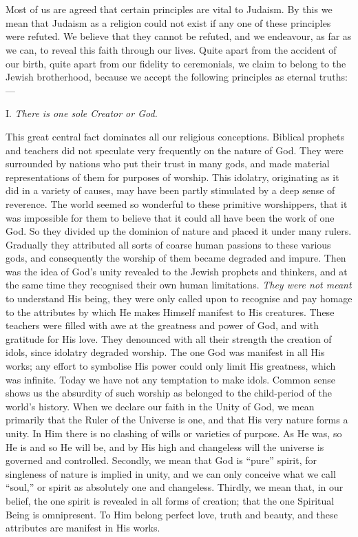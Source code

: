 \chapter{}

Most of us are agreed that certain principles
are vital to Judaism. By this we mean that
Judaism as a religion could not exist if any
one of these principles were refuted. We
believe that they cannot be refuted, and we
endeavour, as far as we can, to reveal this
faith through our lives. Quite apart from
the accident of our birth, quite apart from
our fidelity to ceremonials, we claim to belong
to the Jewish brotherhood, because we
accept the following principles as eternal
truths:—

I. \textsl{There is one sole Creator or God.}

This great central fact dominates all our
religious conceptions. Biblical prophets and
teachers did not speculate very frequently
on the nature of God. They were surrounded
by nations who put their trust in many gods,
and made material representations of them
for purposes of worship. This idolatry,
originating as it did in a variety of causes,
may have been partly stimulated by a deep
sense of reverence. The world seemed so
wonderful to these primitive worshippers,
that it was impossible for them to believe
that it could all have been the work of one
God. So they divided up the dominion of
nature and placed it under many rulers.
Gradually they attributed all sorts of coarse
human passions to these various gods, and
consequently the worship of them became
degraded and impure. Then was the idea
of God’s unity revealed to the Jewish prophets
and thinkers, and at the same time they
recognised their own human limitations.
\textsl{They were not meant} to understand His
being, they were only called upon to recognise
and pay homage to the attributes by
which He makes Himself manifest to His
creatures. These teachers were filled with
awe at the greatness and power of God, and
with gratitude for His love. They denounced
with all their strength the creation of idols,
since idolatry degraded worship. The one
God was manifest in all His works; any
effort to symbolise His power could only
limit His greatness, which was infinite. Today
we have not any temptation to make
idols. Common sense shows us the absurdity
of such worship as belonged to the child-period
of the world’s history. When we
declare our faith in the Unity of God, we
mean primarily that the Ruler of the Universe
is one, and that His very nature forms a unity.
In Him there is no clashing of wills or
varieties of purpose. As He was, so He is
and so He will be, and by His high and
changeless will the universe is governed and
controlled. Secondly, we mean that God is
“pure” spirit, for singleness of nature is
implied in unity, and we can only conceive
what we call “soul,” or spirit as absolutely one
and changeless. Thirdly, we mean that, in
our belief, the one spirit is revealed in all
forms of creation; that the one Spiritual
Being is omnipresent. To Him belong
perfect love, truth and beauty, and these
attributes are manifest in His works.


